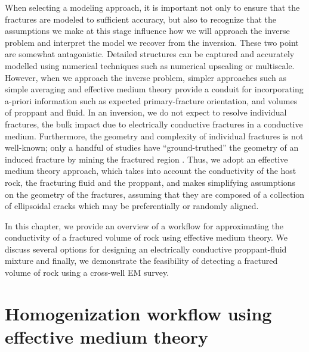 When selecting a modeling approach, it is important not only to ensure that the fractures are modeled to sufficient accuracy, but also to recognize that the assumptions we make at this stage influence how we will approach the inverse problem and interpret the model we recover from the inversion. These two point are somewhat antagonistic. Detailed structures can be captured and accurately modelled using numerical techniques such as numerical upscaling or multiscale. However, when we approach the inverse problem, simpler approaches such as simple averaging and effective medium theory provide a conduit for incorporating a-priori information such as expected primary-fracture orientation, and volumes of proppant and fluid. In an inversion, we do not expect to resolve individual fractures, the bulk impact due to electrically conductive fractures in a conductive medium. Furthermore, the geometry and complexity of individual fractures is not well-known; only a handful of studies have ``ground-truthed'' the geometry of an induced fracture by mining the fractured region \citep{Cipolla2008a}. Thus, we adopt an effective medium theory approach, which takes into account the conductivity of the host rock, the fracturing fluid and the proppant, and makes simplifying assumptions on the geometry of the fractures, assuming that they are composed of a collection of ellipsoidal cracks which may be preferentially or randomly aligned.

In this chapter, we provide an overview of a workflow for approximating the conductivity of a fractured volume of rock using effective medium theory. We discuss several options for designing an electrically conductive proppant-fluid mixture and finally, we demonstrate the feasibility of detecting a fractured volume of rock using a cross-well EM survey.

\section{Homogenization workflow using effective medium theory}

